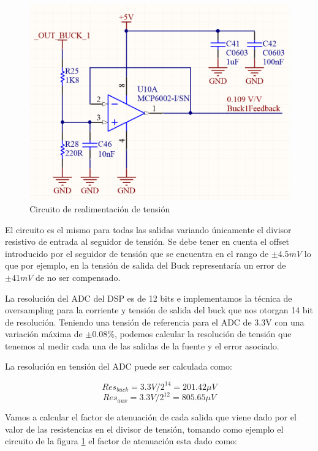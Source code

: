 \documentclass[12pt]{report}
\begin{document}
\begin{figure}[H]
	\centering
	\includegraphics[width=\textwidth,height=\textheight,keepaspectratio]{voltage_feedback}
	\caption{Circuito de realimentación de tensión}
	\label{voltage_feedback_circuit}
\end{figure}

El circuito es el mismo para todas las salidas variando únicamente el divisor resistivo de entrada al seguidor de tensión. Se debe tener en cuenta el offset introducido por el seguidor de tensión que se encuentra en el rango de $\pm 4.5mV$ lo que por ejemplo, en la tensión de salida del Buck representaría un error de $\pm 41mV$ de no ser compensado.

La resolución del ADC del DSP es de 12 bits e implementamos la técnica de oversampling para la corriente y tensión de salida del buck que nos otorgan 14 bit de resolución. Teniendo una tensión de referencia para el ADC de 3.3V con una variación máxima de $\pm0.08\%$, podemos calcular la resolución de tensión que tenemos al medir cada una de las salidas de la fuente y el error asociado.

La resolución en tensión del ADC puede ser calculada como:

\begin{equation}
	Res_{buck} = 3.3V / 2^{14} = 201.42 \mu V
\end{equation}
\begin{equation}
	Res_{aux} = 3.3V / 2^{12} = 805.65 \mu V
\end{equation}

Vamos a calcular el factor de atenuación de cada salida que viene dado por el valor de las resistencias en el divisor de tensión, tomando como ejemplo el circuito de la figura \ref{voltage_feedback_circuit} el factor de atenuación esta dado como:
\end{document}
